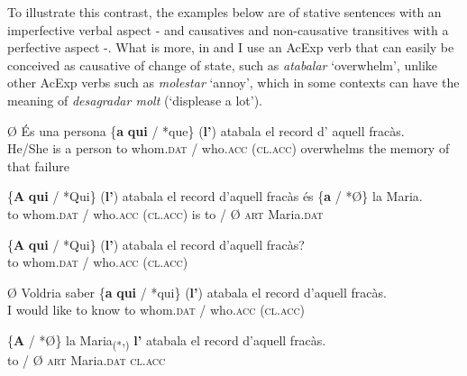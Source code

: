\documentclass[output=paper,colorlinks,citecolor=brown,modfonts,nonflat]{langsci/langscibook}
\begin{document}
To illustrate this contrast, the examples below are of stative sentences with an imperfective verbal aspect - and causatives and non-causative transitives with a perfective aspect -. What is more, in  and  I use an AcExp verb that can easily be conceived as causative of change of state, such as \textit{atabalar} ‘overwhelm’, unlike other AcExp verbs such as \textit{molestar} ‘annoy’, which in some contexts can have the meaning of  \textit{desagradar molt} (‘displease a lot’).

\ea%
 \label{ex:royo:14}
 \ea \label{ex:royo:14a}
 \gll Ø És una persona \{\textbf{a} \textbf{qui} / *que\} (\textbf{l’}) atabala el record d’ aquell fracàs.\\
  He/She is a person to whom.\textsc{dat} / who.\textsc{acc} (\textsc{cl.acc}) overwhelms the memory of that failure \\
\glt {}
 
 \ex \label{ex:royo:14b}
 \gll \{\textbf{A} \textbf{qui} / *Qui\} (\textbf{l’}) atabala el record d’aquell fracàs és \{\textbf{a} / *Ø\} la Maria.\\
 to whom.\textsc{dat} / who.\textsc{acc} (\textsc{cl.acc}) is to / Ø \textsc{art} Maria.\textsc{dat} \\
\glt {}
 
 \ex \label{ex:royo:14c}
 \gll \{\textbf{A} \textbf{qui} / *Qui\} (\textbf{l’}) atabala el record d’aquell fracàs?\\
 to whom.\textsc{dat} / who.\textsc{acc} (\textsc{cl.acc}) \\
\glt {}
 
 \ex \label{ex:royo:14d}
 \gll Ø Voldria saber \{\textbf{a} \textbf{qui} / *qui\} (\textbf{l’}) atabala el record d’aquell fracàs.\\
 I would like to know to whom.\textsc{dat} / who.\textsc{acc} (\textsc{cl.acc}) \\
\glt {}
 
 \ex \label{ex:royo:14e}
 \gll \{\textbf{A} / *Ø\} la Maria\textsubscript{(*},\textsubscript{)} \textbf{l’} atabala el record d’aquell fracàs.\\
 to / Ø \textsc{art} Maria.\textsc{dat} \textsc{cl.acc} \\
\glt {}
 
 
 \z
 \z
 
\end{document}
